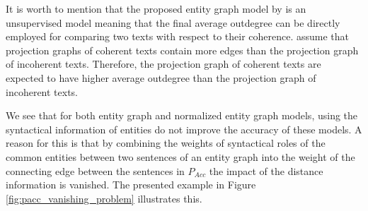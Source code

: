 It is worth to mention that the proposed entity graph model by  is an unsupervised model meaning that the final average outdegree can be directly employed for comparing two texts with respect to their coherence. 
 assume that projection graphs of coherent texts contain more edges than the projection graph of incoherent texts. 
Therefore, the projection graph of coherent texts are expected to have higher average outdegree than the projection graph of incoherent texts.  


We see that for both entity graph and normalized entity graph models, using the syntactical information of entities do not improve the accuracy of these models. 
A reason for this is that by combining the weights of syntactical roles of the common entities between two sentences of an entity graph into the weight of the connecting edge between the sentences in $P_{Acc}$ the impact of the distance information is vanished.  
The presented example in Figure \ref{fig:pacc_vanishing_problem} illustrates this. 

